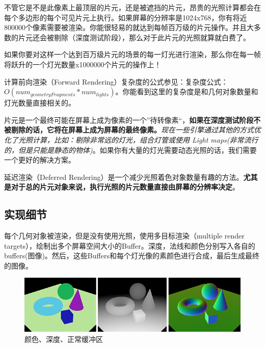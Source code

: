 \documentclass[UTF8,a4paper,12pt]{ctexbook}
\begin{document}
			不管它是不是此像素上最顶层的片元，还是被遮挡的片元，昂贵的光照计算都会在每个多边形的每个可见片元上执行。如果屏幕的分辨率是1024x768，你有将近800000个像素需要被渲染。你能很轻易的就达到每帧百万级的片元操作。并且大多数的片元还会被剔除（深度测试阶段），那么对于此片元的光照就算就白费了。
			
			如果你要对这样一个达到百万级片元的场景的每一灯光进行渲染，那么你在每一帧将跃升的一个灯光数量x1000000个片元的操作上！
			
			计算前向渲染（Forward Rendering）复杂度的公式参见：复杂度公式：$O(num_{geometryFragments} * num_{lights})$。你能看到这里的复杂度是和几何对象数量和灯光数量直接相关的。
			
			片元是一个最终可能在屏幕上成为像素的一个”待转像素“，\textbf{如果在深度测试阶段不被剔除的话，它将在屏幕上成为屏幕的最终像素。}\textit{现在一些引擎通过其他的方式优化了光照计算，比如：剔除非常远的灯光，组合灯管或使用 Light maps(非常流行的，但是只能是静态的物体)}。如果你有大量的灯光需要动态光照的话，我们需要一个更好的解决方案。
			
			延迟渲染（Deferred Rendering）是一个减少光照着色对象数量有趣的方法。\textbf{尤其是对于总的片元对象来说，执行光照的片元数量直接由屏幕的分辨率决定}。
		
		\subsection{实现细节}
			每个几何对象被渲染，但是没有使用光照，使用多目标渲染（multiple render targets），绘制出多个屏幕空间大小的Buffer。深度，法线和颜色分别写入各自的buffers(图像)。然后，这些Buffers和每个灯光像的素颜色进行合成，最后生成最终的图像。
			
			\begin{figure}[H]
				\centering
				\includegraphics[width=\linewidth]{Defferred02}
				\caption{颜色、深度、正常缓冲区}
			\end{figure}
			
\end{document}
